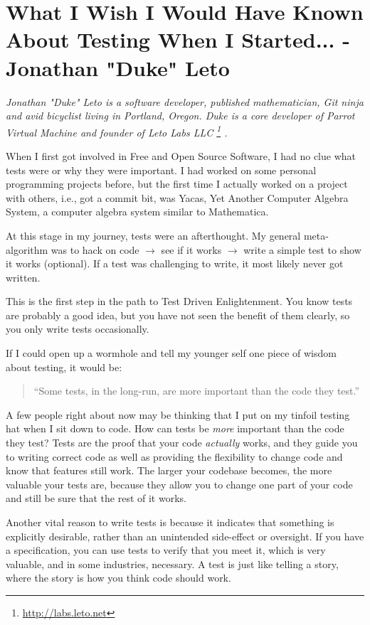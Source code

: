 \chapter{What I Wish I Would Have Known About Testing When I Started... -
Jonathan "Duke" Leto}


\textit{ Jonathan "Duke" Leto is a software developer, published mathematician,
Git ninja and avid bicyclist living in Portland, Oregon. Duke is a core
developer of Parrot Virtual Machine and founder of Leto Labs LLC \footnote{\url{http://labs.leto.net}} .
}

When I first got involved in Free and Open Source Software, I had no clue what
tests were or why they were important. I had worked on some personal programming
projects before, but the first time I actually worked on a project with others,
i.e., got a commit bit, was Yacas, Yet Another Computer Algebra System, a computer algebra system similar to Mathematica.

At this stage in my journey, tests were an afterthought. My general
meta-algorithm was to hack on code $\rightarrow$ see if it works $\rightarrow$
write a simple test to show it works (optional). If a test was challenging to
write, it most likely never got written.

This is the first step in the path to Test Driven Enlightenment. You know tests
are probably a good idea, but you have not seen the benefit of them clearly, so
you only write tests occasionally.

If I could open up a wormhole and tell my younger self one piece of wisdom about
testing, it would be:
\begin{quote}``Some tests, in the long-run, are more important than the code
they test.''\end{quote}

A few people right about now may be thinking that I put on my tinfoil testing
hat when I sit down to code. How can tests be \emph{more} important than the
code they test? Tests are the proof that your code \emph{actually} works, and
they guide you to writing correct code as well as providing the flexibility to
change code and know that features still work. The larger your codebase becomes,
the more valuable your tests are, because they allow you to change one part of
your code and still be sure that the rest of it works.

Another vital reason to write tests is because it indicates that something is
explicitly desirable, rather than an unintended side-effect or oversight. If you
have a specification, you can use tests to verify that you meet it, which is
very valuable, and in some industries, necessary. A test is just like telling a
story, where the story is how you think code should work.

